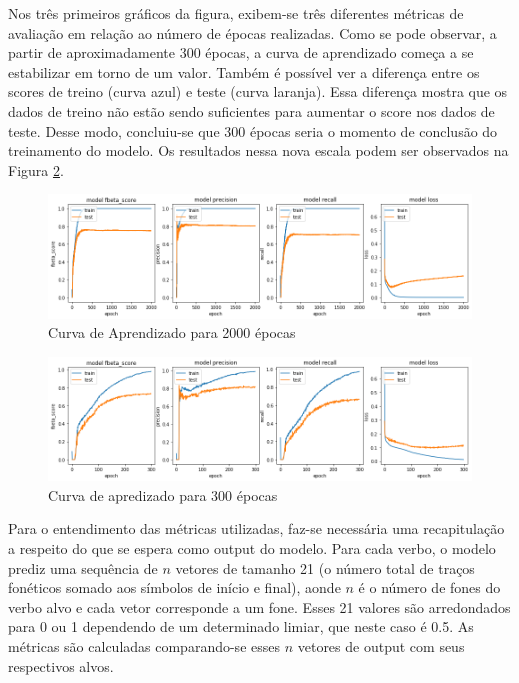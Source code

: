 Nos três primeiros gráficos da figura, exibem-se três diferentes métricas de avaliação em relação ao número de épocas realizadas. 
Como se pode observar, a partir de aproximadamente 300 épocas, a curva de aprendizado começa a se estabilizar em torno de um valor. Também é possível ver a diferença entre os scores de treino (curva azul) e teste (curva laranja). Essa diferença mostra que os dados de treino não estão sendo suficientes para aumentar o score nos dados de teste. Desse modo, concluiu-se que 300 épocas seria o momento de conclusão do treinamento do modelo. Os resultados nessa nova escala podem ser observados na Figura \ref{fig:training}.  

\begin{figure}[H]
  \centering
  \includegraphics[width=1.0\linewidth]{img/2000_precision.png}
  \caption{Curva de Aprendizado para 2000 épocas}
  \label{fig:training2000}
\end{figure}

\begin{figure}[H]
  \centering
  \includegraphics[width=1.0\linewidth]{img/300_fbeta.png}
  \caption{Curva de apredizado para 300 épocas}
  \label{fig:training}
\end{figure}

Para o entendimento das métricas utilizadas, faz-se necessária uma recapitulação a respeito do que se espera como output do modelo. Para cada verbo, o modelo prediz uma sequência de $n$ vetores de tamanho 21 (o número total de traços fonéticos somado aos símbolos de início e final), aonde $n$ é o número de fones do verbo alvo e cada vetor corresponde a um fone. Esses 21 valores são arredondados para 0 ou 1 dependendo de um determinado limiar, que neste caso é 0.5. As métricas são calculadas comparando-se esses $n$ vetores de output com seus respectivos alvos.

